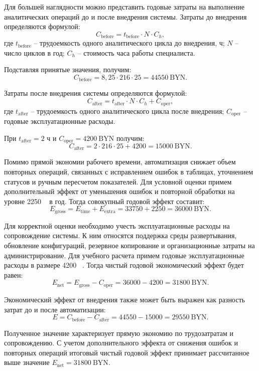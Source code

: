 Для большей наглядности можно представить годовые затраты на выполнение аналитических операций до и после внедрения системы. Затраты до внедрения определяются формулой:
\[
C_{\text{before}} = t_{\text{before}} \cdot N \cdot C_h,
\]
где $t_{\text{before}}$ -- трудоемкость одного аналитического цикла до внедрения, ч; $N$ -- число циклов в год; $C_h$ -- стоимость часа работы специалиста.

Подставляя принятые значения, получим:
\[
C_{\text{before}} = 8{,}25 \cdot 216 \cdot 25 = 44550 \ \text{BYN}.
\]

Затраты после внедрения системы определяются формулой:
\[
C_{\text{after}} = t_{\text{after}} \cdot N \cdot C_h + C_{\text{oper}},
\]
где $t_{\text{after}}$ -- трудоемкость одного аналитического цикла после внедрения; $C_{\text{oper}}$ -- годовые эксплуатационные расходы.

При $t_{\text{after}} = 2$ ч и $C_{\text{oper}} = 4200 \ \text{BYN}$ получим:
\[
C_{\text{after}} = 2 \cdot 216 \cdot 25 + 4200 = 15000 \ \text{BYN}.
\]

Помимо прямой экономии рабочего времени, автоматизация снижает объем повторных операций, связанных с исправлением ошибок в таблицах, уточнением статусов и ручным пересчетом показателей. Для условной оценки примем дополнительный эффект от уменьшения ошибок и повторной обработки на уровне 2250 \  в год. Тогда совокупный годовой эффект составит:
\[
E_{\text{gross}} = E_{\text{time}} + E_{\text{extra}} = 33750 + 2250 = 36000 \ \text{BYN}.
\]

Для корректной оценки необходимо учесть эксплуатационные расходы на сопровождение системы. К ним относятся поддержка среды развертывания, обновление конфигураций, резервное копирование и организационные затраты на администрирование. Для учебного расчета примем годовые эксплуатационные расходы в размере 4200 \ . Тогда чистый годовой экономический эффект будет равен:
\[
E_{\text{net}} = E_{\text{gross}} - C_{\text{oper}} = 36000 - 4200 = 31800 \ \text{BYN}.
\]

Экономический эффект от внедрения также может быть выражен как разность затрат до и после автоматизации:
\[
E = C_{\text{before}} - C_{\text{after}} = 44550 - 15000 = 29550 \ \text{BYN}.
\]

Полученное значение характеризует прямую экономию по трудозатратам и сопровождению. С учетом дополнительного эффекта от снижения ошибок и повторных операций итоговый чистый годовой эффект принимает рассчитанное выше значение $E_{\text{net}} = 31800 \ \text{BYN}$.

